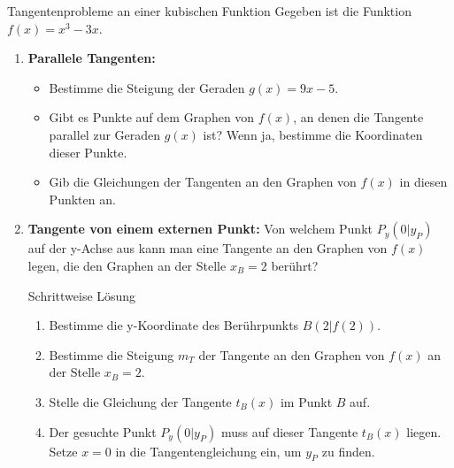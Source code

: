 \begin{aufgabenumgebung}{Tangentenprobleme an einer kubischen Funktion}
Gegeben ist die Funktion $f(x) = x^3 - 3x$.
\begin{enumerate}
    \item \textbf{Parallele Tangenten:}
        \begin{itemize}
            \item Bestimme die Steigung der Geraden $g(x) = 9x - 5$.
            \item Gibt es Punkte auf dem Graphen von $f(x)$, an denen die Tangente parallel zur Geraden $g(x)$ ist? Wenn ja, bestimme die Koordinaten dieser Punkte.
            \item Gib die Gleichungen der Tangenten an den Graphen von $f(x)$ in diesen Punkten an.
        \end{itemize}
    \item \textbf{Tangente von einem externen Punkt:}
        Von welchem Punkt $P_y(0|y_P)$ auf der y-Achse aus kann man eine Tangente an den Graphen von $f(x)$ legen, die den Graphen an der Stelle $x_B=2$ berührt?
        \begin{tippumgebung}{Schrittweise Lösung}
        \begin{enumerate}
            \item Bestimme die y-Koordinate des Berührpunkts $B(2|f(2))$.
            \item Bestimme die Steigung $m_T$ der Tangente an den Graphen von $f(x)$ an der Stelle $x_B=2$.
            \item Stelle die Gleichung der Tangente $t_B(x)$ im Punkt $B$ auf.
            \item Der gesuchte Punkt $P_y(0|y_P)$ muss auf dieser Tangente $t_B(x)$ liegen. Setze $x=0$ in die Tangentengleichung ein, um $y_P$ zu finden.
        \end{enumerate}
        \end{tippumgebung}
\end{enumerate}
\end{aufgabenumgebung}



